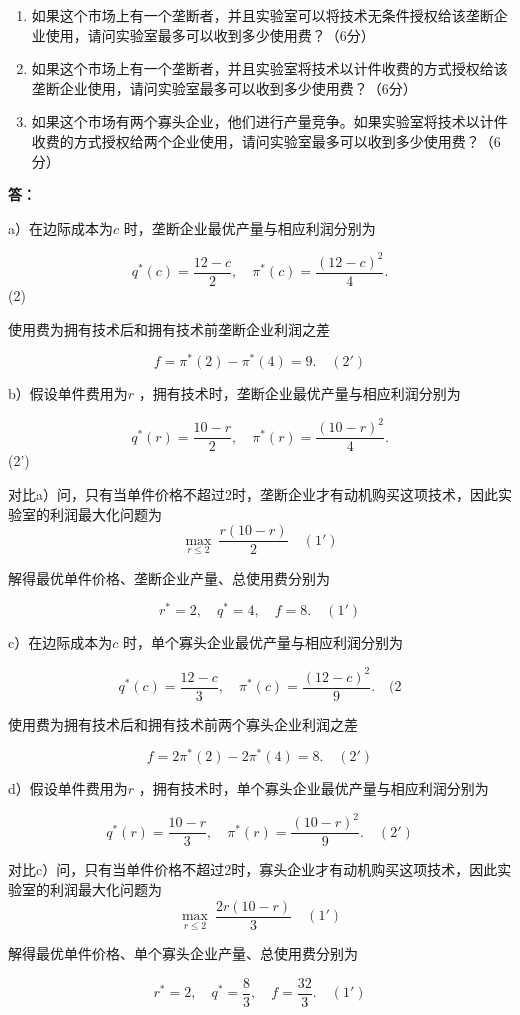 \documentclass[12pt]{article}
\begin{document}
\begin{enumerate}
\item 如果这个市场上有一个垄断者，并且实验室可以将技术无条件授权给该垄断企业使用，请问实验室最多可以收到多少使用费？（6分）
\item 如果这个市场上有一个垄断者，并且实验室将技术以计件收费的方式授权给该垄断企业使用，请问实验室最多可以收到多少使用费？（6分）
\item 如果这个市场有两个寡头企业，他们进行产量竞争。如果实验室将技术以计件收费的方式授权给两个企业使用，请问实验室最多可以收到多少使用费？（6分）
\end{enumerate}

\noindent \textbf{答：}

a）在边际成本为$c$ 时，垄断企业最优产量与相应利润分别为

$$q^*(c)=\frac{12-c}{2},\quad\pi^*(c)=\frac{(12-c)^2}{4}.$$
(2)

使用费为拥有技术后和拥有技术前垄断企业利润之差

$$f=\pi^*(2)-\pi^*(4)=9.\quad(2')$$

b）假设单件费用为$r$ ，拥有技术时，垄断企业最优产量与相应利润分别为

$$q^*(r)=\frac{10-r}{2},\quad\pi^*(r)=\frac{(10-r)^2}{4}.$$
(2')

对比a）问，只有当单件价格不超过2时，垄断企业才有动机购买这项技术，因此实验室的利润最大化问题为
$$\max_{r\leq2}\:\frac{r(10-r)}{2}\quad(1')$$

解得最优单件价格、垄断企业产量、总使用费分别为

$$r^*=2,\quad q^*=4,\quad f=8.\quad(1')$$

c）在边际成本为$c$ 时，单个寡头企业最优产量与相应利润分别为

$$q^*(c)=\frac{12-c}{3},\quad\pi^*(c)=\frac{(12-c)^2}{9}.\quad(2$$

使用费为拥有技术后和拥有技术前两个寡头企业利润之差

$$f=2\pi^*(2)-2\pi^*(4)=8.\quad(2')$$

d）假设单件费用为$r$ ，拥有技术时，单个寡头企业最优产量与相应利润分别为

$$q^*(r)=\frac{10-r}{3},\quad\pi^*(r)=\frac{(10-r)^2}{9}.\quad(2')$$

对比c）问，只有当单件价格不超过2时，寡头企业才有动机购买这项技术，因此实验室的利润最大化问题为
$$\max_{r\leq2}\:\frac{2r(10-r)}{3}\quad(1')$$

解得最优单件价格、单个寡头企业产量、总使用费分别为

$$r^*=2,\quad q^*=\frac{8}{3},\quad f=\frac{32}{3}.\quad(1')$$
\end{document}
